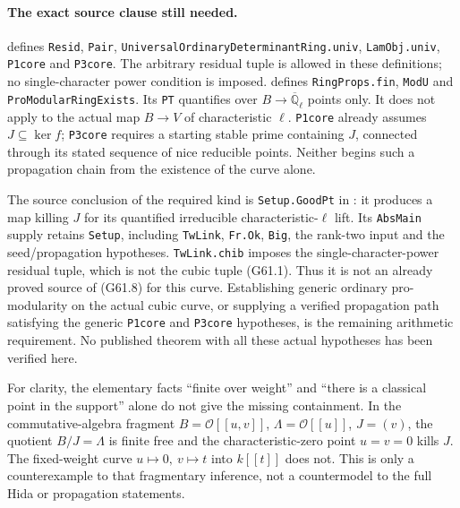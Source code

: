 \paragraph{The exact source clause still needed.}
defines \texttt{Resid}, \texttt{Pair},
\texttt{UniversalOrdinaryDeterminantRing.univ},
\texttt{LamObj.univ}, \texttt{P1core} and \texttt{P3core}.
The arbitrary residual tuple is allowed in these definitions;
no single-character power condition is imposed.
defines \texttt{RingProps.fin}, \texttt{ModU} and
\texttt{ProModularRingExists}.
Its \texttt{PT} quantifies over
\(B\to\overline{\mathbb Q}_\ell\) points only.  It does
not apply to the actual map \(B\to V\) of characteristic
\(\ell\).  \texttt{P1core} already assumes
\(J\subseteq\ker f\); \texttt{P3core} requires a starting
stable prime containing \(J\), connected through its stated
sequence of nice reducible points.  Neither begins such a
propagation chain from the existence of the curve alone.

The source conclusion of the required kind is
\texttt{Setup.GoodPt} in
:
it produces a map killing \(J\) for its quantified irreducible
characteristic-\(\ell\) lift.  Its \texttt{AbsMain} supply
retains \texttt{Setup}, including \texttt{TwLink},
\texttt{Fr.Ok}, \texttt{Big}, the rank-two input and the
seed/propagation hypotheses.  \texttt{TwLink.chib} imposes
the single-character-power residual tuple, which is not the
cubic tuple (G61.1).  Thus it is not an already proved source
of (G61.8) for this curve.  Establishing generic ordinary
pro-modularity on the actual cubic curve, or supplying a
verified propagation path satisfying the generic \texttt{P1core}
and \texttt{P3core} hypotheses, is the remaining arithmetic
requirement.  No published theorem with all these actual
hypotheses has been verified here.

For clarity, the elementary facts ``finite over weight'' and
``there is a classical point in the support'' alone do not give
the missing containment.  In the commutative-algebra fragment
\(B=\mathcal O[[u,v]]\), \(\Lambda=\mathcal O[[u]]\),
\(J=(v)\), the quotient \(B/J=\Lambda\) is finite free and
the characteristic-zero point \(u=v=0\) kills \(J\).
The fixed-weight curve \(u\mapsto0,\ v\mapsto t\) into
\(k[[t]]\) does not.  This is only a counterexample to that
fragmentary inference, not a countermodel to the full Hida
or propagation statements.

